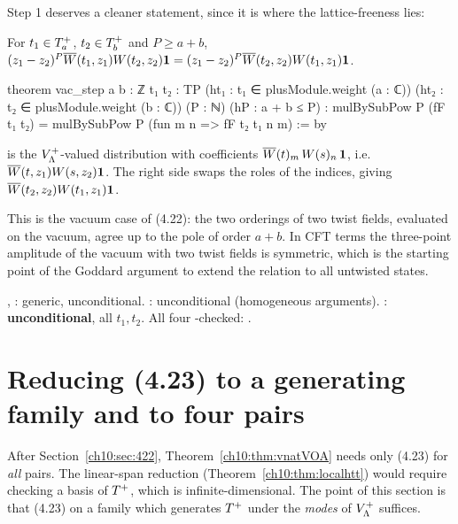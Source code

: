 Step 1 deserves a cleaner statement, since it is where the lattice-freeness lies:
\begin{proposition}\label{ch10:prop:vacstep}
For $t_1\in T^{+}_a$, $t_2\in T^{+}_b$ and $P\ge a+b$,
$(z_1-z_2)^P\overline{W}(t_1,z_1)W(t_2,z_2)\mathbf1=(z_1-z_2)^P\overline{W}(t_2,z_2)W(t_1,z_1)\mathbf1$.
\end{proposition}
\begin{leancode}
theorem vac_step {a b : ℤ} {t₁ t₂ : TP} (ht₁ : t₁ ∈ plusModule.weight (a : ℂ))
    (ht₂ : t₂ ∈ plusModule.weight (b : ℂ)) (P : ℕ) (hP : a + b ≤ P) :
    mulBySubPow P (fF t₁ t₂) = mulBySubPow P (fun m n => fF t₂ t₁ n m) := by
\end{leancode}
\begin{dictionary}
 is the $V_{\Lambda}^{+}$-valued distribution with coefficients
$\overline{W}(t)_m\,W(s)_n\,\mathbf 1$, i.e.\ $\overline{W}(t,z_1)W(s,z_2)\mathbf 1$.  The right side swaps the
roles of the indices, giving $\overline{W}(t_2,z_2)W(t_1,z_1)\mathbf 1$.
\end{dictionary}

\begin{physics}
This is the vacuum case of (4.22): the two orderings of two twist fields, evaluated on the vacuum, agree up to the pole of order $a+b$. In CFT terms the three-point amplitude of the vacuum with two twist fields is symmetric, which is the starting point of the Goddard argument to extend the relation to all untwisted states.
\end{physics}

\begin{status}
, : generic, unconditional.  :
unconditional (homogeneous arguments).  : \textbf{unconditional},
all $t_1,t_2$.  All four -checked: .
\end{status}

\section{Reducing (4.23) to a generating family and to four pairs}\label{ch10:sec:gap}

After Section~\ref{ch10:sec:422}, Theorem~\ref{ch10:thm:vnatVOA} needs only (4.23) for
\emph{all} pairs.  The linear-span reduction (Theorem~\ref{ch10:thm:localhtt}) would require
checking a basis of $T^{+}$, which is infinite-dimensional.  The point of this section is that
(4.23) on a family which generates $T^{+}$ under the \emph{modes} of $V_{\Lambda}^{+}$ suffices.

